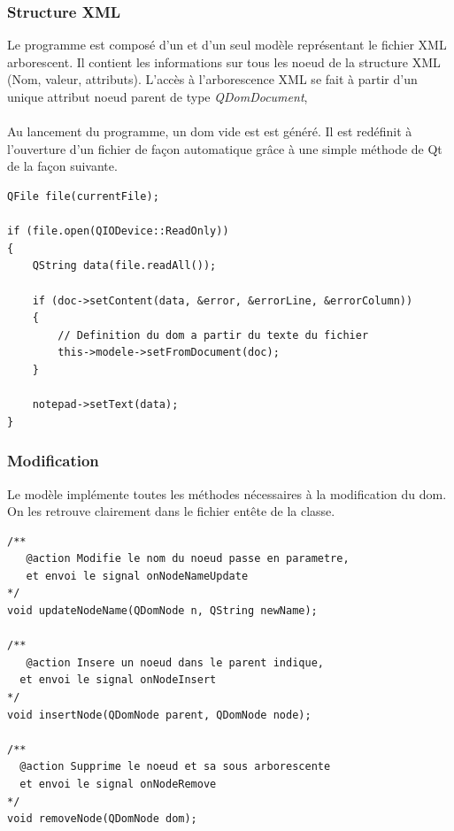 \subsubsection{Structure XML}

Le programme est composé d'un et d'un seul modèle représentant le fichier XML arborescent.
Il contient les informations sur tous les noeud de la structure XML (Nom, valeur, attributs).
L'accès à l'arborescence XML se fait à partir d'un unique attribut noeud parent de type \emph{QDomDocument}, 

\paragraph{}
Au lancement du programme, un dom vide est est généré. Il est redéfinit à l'ouverture d'un fichier de façon automatique grâce à une simple méthode de Qt de la façon suivante.

\begin{lstlisting}
QFile file(currentFile);

if (file.open(QIODevice::ReadOnly))
{
    QString data(file.readAll());

    if (doc->setContent(data, &error, &errorLine, &errorColumn))
    {
        // Definition du dom a partir du texte du fichier
        this->modele->setFromDocument(doc);
    }

    notepad->setText(data);
}
\end{lstlisting}

\subsubsection{Modification}

Le modèle implémente toutes les méthodes nécessaires à la modification du dom. On les retrouve clairement dans le fichier entête de la classe.


\begin{lstlisting}
/**
   @action Modifie le nom du noeud passe en parametre,
   et envoi le signal onNodeNameUpdate
*/
void updateNodeName(QDomNode n, QString newName);

/**
   @action Insere un noeud dans le parent indique,
  et envoi le signal onNodeInsert
*/
void insertNode(QDomNode parent, QDomNode node);

/**
  @action Supprime le noeud et sa sous arborescente
  et envoi le signal onNodeRemove
*/
void removeNode(QDomNode dom);
\end{lstlisting}

